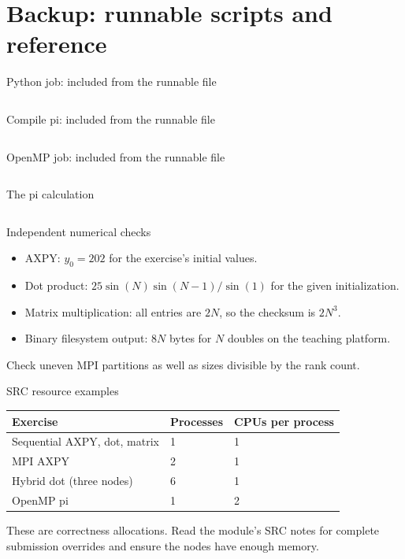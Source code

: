 \documentclass[aspectratio=169,11pt]{beamer}
\begin{document}
\section{Backup: runnable scripts and reference}
\begin{frame}[fragile]{Python job: included from the runnable file}
\inputminted{bash}{../course-module-fundamentals-of-hpc/hands-on/python.sh}
\end{frame}
\begin{frame}[fragile]{Compile pi: included from the runnable file}
\inputminted{bash}{../course-module-fundamentals-of-hpc/hands-on/compilepi}
\end{frame}
\begin{frame}[fragile]{OpenMP job: included from the runnable file}
\inputminted{bash}{../course-module-fundamentals-of-hpc/hands-on/pi.sh}
\end{frame}
\begin{frame}[fragile]{The pi calculation}
\inputminted[fontsize=\tiny]{c}{../course-module-fundamentals-of-hpc/hands-on/pi.c}
\end{frame}
\begin{frame}{Independent numerical checks}
\begin{itemize}
\item AXPY: $y_0=202$ for the exercise's initial values.
\item Dot product: $25\sin(N)\sin(N-1)/\sin(1)$ for the given initialization.
\item Matrix multiplication: all entries are $2N$, so the checksum is $2N^3$.
\item Binary filesystem output: $8N$ bytes for $N$ doubles on the teaching platform.
\end{itemize}
Check uneven MPI partitions as well as sizes divisible by the rank count.
\end{frame}
\begin{frame}{SRC resource examples}
\begin{tabular}{lll}
\toprule
Exercise & Processes & CPUs per process\\\midrule
Sequential AXPY, dot, matrix & 1 & 1\\
MPI AXPY & 2 & 1\\
Hybrid dot (three nodes) & 6 & 1\\
OpenMP pi & 1 & 2\\\bottomrule
\end{tabular}
\par\medskip
These are correctness allocations. Read the module's SRC notes for complete
submission overrides and ensure the nodes have enough memory.
\end{frame}
\end{document}
